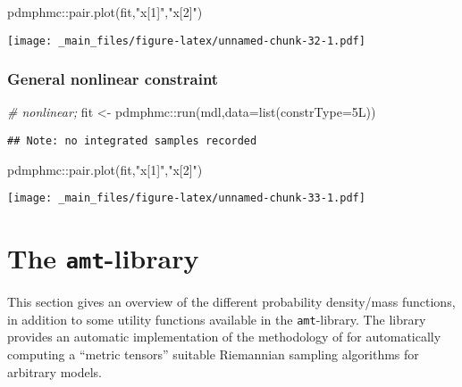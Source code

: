 \documentclass[
]{book}
\newenvironment{Shaded}{\begin{snugshade}}{\end{snugshade}}
\newcommand{\AttributeTok}[1]{\textcolor[rgb]{0.77,0.63,0.00}{#1}}
\newcommand{\CommentTok}[1]{\textcolor[rgb]{0.56,0.35,0.01}{\textit{#1}}}
\newcommand{\FunctionTok}[1]{\textcolor[rgb]{0.00,0.00,0.00}{#1}}
\newcommand{\NormalTok}[1]{#1}
\newcommand{\OtherTok}[1]{\textcolor[rgb]{0.56,0.35,0.01}{#1}}
\newcommand{\SpecialCharTok}[1]{\textcolor[rgb]{0.00,0.00,0.00}{#1}}
\newcommand{\StringTok}[1]{\textcolor[rgb]{0.31,0.60,0.02}{#1}}
\begin{document}
\begin{Shaded}
\begin{Highlighting}[]
\NormalTok{pdmphmc}\SpecialCharTok{::}\FunctionTok{pair.plot}\NormalTok{(fit,}\StringTok{"x[1]"}\NormalTok{,}\StringTok{"x[2]"}\NormalTok{)}
\end{Highlighting}
\end{Shaded}

\texttt{[image: \_main\_files/figure-latex/unnamed-chunk-32-1.pdf]}

\hypertarget{general-nonlinear-constraint}{%
\subsection{General nonlinear constraint}\label{general-nonlinear-constraint}}

\begin{Shaded}
\begin{Highlighting}[]
\CommentTok{\# nonlinear;}
\NormalTok{fit }\OtherTok{\textless{}{-}}\NormalTok{ pdmphmc}\SpecialCharTok{::}\FunctionTok{run}\NormalTok{(mdl,}\AttributeTok{data=}\FunctionTok{list}\NormalTok{(}\AttributeTok{constrType=}\NormalTok{5L))}
\end{Highlighting}
\end{Shaded}

\begin{verbatim}
## Note: no integrated samples recorded
\end{verbatim}

\begin{Shaded}
\begin{Highlighting}[]
\NormalTok{pdmphmc}\SpecialCharTok{::}\FunctionTok{pair.plot}\NormalTok{(fit,}\StringTok{"x[1]"}\NormalTok{,}\StringTok{"x[2]"}\NormalTok{)}
\end{Highlighting}
\end{Shaded}

\texttt{[image: \_main\_files/figure-latex/unnamed-chunk-33-1.pdf]}

\hypertarget{amt-lib}{%
\chapter{\texorpdfstring{The \texttt{amt}-library}{The amt-library}}\label{amt-lib}}

This section gives an overview of the different probability density/mass functions, in addition to some utility functions available in the \texttt{amt}-library. The library provides an automatic
implementation of the methodology of \citet{kleppe_amt} for automatically computing a ``metric tensors'' suitable Riemannian sampling algorithms for arbitrary models.
\end{document}
